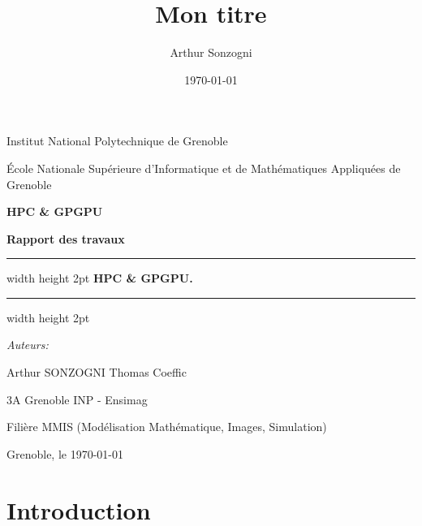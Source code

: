 \documentclass[liens,entete-ensimag,margeCorrection]{ensirapport}
\begin{document}
\title{Mon titre}
\author{Arthur Sonzogni}
\date{\today}

\renewcommand{\labelitemi}{\textbullet}

\large
\thispagestyle{plain}

\begin{center}


Institut National Polytechnique de Grenoble

École Nationale Supérieure d'Informatique et de Mathématiques Appliquées de
Grenoble

\vspace{0.4cm}


{\huge \bfseries HPC \& GPGPU}

\vspace{0.5cm}
{\large \bfseries Rapport des travaux}


\vspace{1.5cm}

\hrule width \textwidth height 2pt
\vspace{0.4cm}
{\Huge \bfseries HPC \& GPGPU.}
\vspace{0.4cm}
\hrule width \textwidth height 2pt

\vspace{2cm}

\end{center}
\begin{minipage}{0.5\textwidth}
    
{\it Auteurs:}

Arthur SONZOGNI
Thomas Coeffic

3A Grenoble INP - Ensimag

Filière MMIS (Modélisation Mathématique, Images, Simulation)

\end{minipage}


\vspace{2cm}

\begin{center}
Grenoble, le \today
\end{center}

\newpage
\normalsize

\tableofcontents

\newpage

\section{Introduction}
\end{document}
